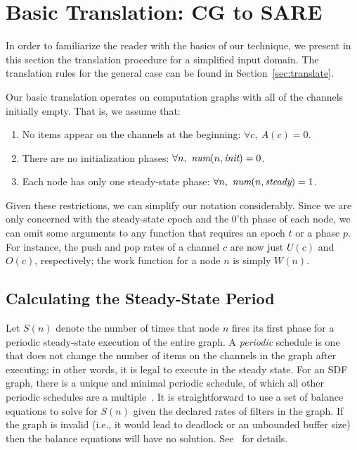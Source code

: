 \section{Basic Translation: CG to SARE}
\label{sec:simple}

In order to familiarize the reader with the basics of our technique,
we present in this section the translation procedure for a simplified
input domain.  The translation rules for the general case can be found
in Section~\ref{sec:translate}.

Our basic translation operates on computation graphs with all of the
channels initially empty.  That is, we assume that:
\begin{enumerate}

\item No items appear on the channels at the beginning:  $\forall c,~A(c) = 0$.

\item There are no initialization phases: $\forall n,~\mbox{\it num}(n, \mbox{\it init}) = 0$.

\item Each node has only one steady-state phase: $\forall n,~\mbox{\it num}(n, \mbox{\it steady}) = 1$.

\end{enumerate}

Given these restrictions, we can simplify our notation considerably.
Since we are only concerned with the steady-state epoch and the 0'th
phase of each node, we can omit some arguments to any function that
requires an epoch $t$ or a phase $p$.  For instance, the push and pop
rates of a channel $c$ are now just $U(c)$ and $O(c)$, respectively;
the work function for a node $n$ is simply $W(n)$.



\subsection{Calculating the Steady-State Period}
\label{sec:balance}

Let $S(n)$ denote the number of times that node $n$ fires its first
phase for a periodic steady-state execution of the entire graph. A
{\it periodic} schedule is one that does not change the number of
items on the channels in the graph after executing; in other words, it
is legal to execute in the steady state.  For an SDF graph, there is a
unique and minimal periodic schedule, of which all other periodic
schedules are a multiple~\cite{leesdf}.  It is straightforward to use
a set of balance equations to solve for $S(n)$ given the declared
rates of filters in the graph.  If the graph is invalid (i.e., it
would lead to deadlock or an unbounded buffer size) then the balance
equations will have no solution.  See~\cite{leesdf} for details.

